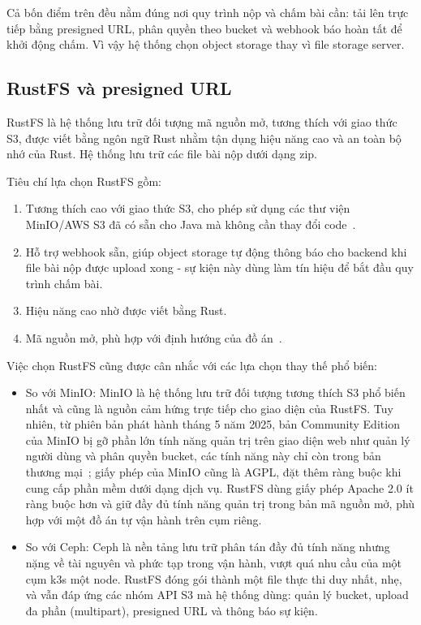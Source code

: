\documentclass[../BTL.tex]{subfiles}
\begin{document}
Cả bốn điểm trên đều nằm đúng nơi quy trình nộp và chấm bài cần: tải lên trực tiếp bằng presigned URL, phân quyền theo bucket và webhook báo hoàn tất để khởi động chấm. Vì vậy hệ thống chọn object storage thay vì file storage server.

\subsection{RustFS và presigned URL}
\label{section:1.6.2}

RustFS là hệ thống lưu trữ đối tượng mã nguồn mở, tương thích với giao thức S3, được viết bằng ngôn ngữ Rust nhằm tận dụng hiệu năng cao và an toàn bộ nhớ của Rust. Hệ thống lưu trữ các file bài nộp dưới dạng zip.

Tiêu chí lựa chọn RustFS gồm:
\begin{enumerate}
    \item Tương thích cao với giao thức S3, cho phép sử dụng các thư viện MinIO/AWS S3 đã có sẵn cho Java mà không cần thay đổi code~\cite{rustfsdocs}.
    \item Hỗ trợ webhook sẵn, giúp object storage tự động thông báo cho backend khi file bài nộp được upload xong - sự kiện này dùng làm tín hiệu để bắt đầu quy trình chấm bài.
    \item Hiệu năng cao nhờ được viết bằng Rust.
    \item Mã nguồn mở, phù hợp với định hướng của đồ án~\cite{rustfsgithub}.
\end{enumerate}

Việc chọn RustFS cũng được cân nhắc với các lựa chọn thay thế phổ biến:
\begin{itemize}
    \item So với MinIO: MinIO là hệ thống lưu trữ đối tượng tương thích S3 phổ biến nhất và cũng là nguồn cảm hứng trực tiếp cho giao diện của RustFS. Tuy nhiên, từ phiên bản phát hành tháng 5 năm 2025, bản Community Edition của MinIO bị gỡ phần lớn tính năng quản trị trên giao diện web như quản lý người dùng và phân quyền bucket, các tính năng này chỉ còn trong bản thương mại~\cite{minioadminui}; giấy phép của MinIO cũng là AGPL, đặt thêm ràng buộc khi cung cấp phần mềm dưới dạng dịch vụ. RustFS dùng giấy phép Apache 2.0 ít ràng buộc hơn và giữ đầy đủ tính năng quản trị trong bản mã nguồn mở, phù hợp với một đồ án tự vận hành trên cụm riêng.
    \item So với Ceph: Ceph là nền tảng lưu trữ phân tán đầy đủ tính năng nhưng nặng về tài nguyên và phức tạp trong vận hành, vượt quá nhu cầu của một cụm k3s một node. RustFS đóng gói thành một file thực thi duy nhất, nhẹ, và vẫn đáp ứng các nhóm API S3 mà hệ thống dùng: quản lý bucket, upload đa phần (multipart), presigned URL và thông báo sự kiện.
\end{itemize}
\end{document}
